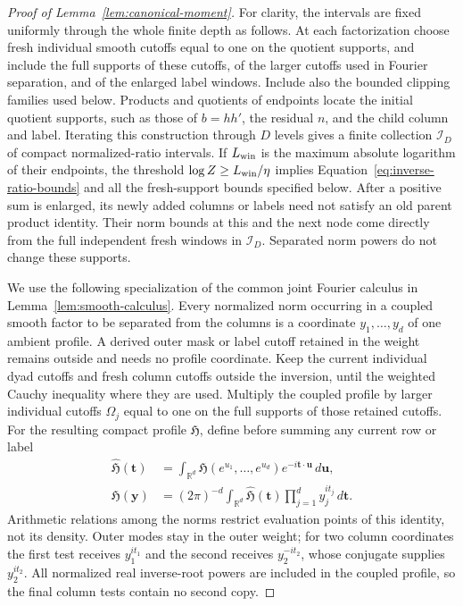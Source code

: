 \documentclass[11pt,a4paper]{article}
\numberwithin{equation}{section}
\numberwithin{figure}{section}
\theoremstyle{definition}
\theoremstyle{remark}
\begin{document}
\begin{proof}[Proof of Lemma~\ref{lem:canonical-moment}]
For clarity, the intervals are fixed uniformly through the whole finite
depth as follows.  At each factorization choose fresh individual smooth
cutoffs equal to one on the quotient supports, and include the full
supports of these cutoffs, of the larger cutoffs used in Fourier
separation, and of the enlarged label windows.  Include also the bounded
clipping families used below.  Products and quotients of endpoints locate
the initial quotient supports, such as those of \(b=hh'\), the residual
\(n\), and the child column and label.  Iterating this construction
through \(D\) levels gives a finite collection \(\mathcal I_D\) of compact
normalized-ratio intervals.  If \(L_{\rm win}\) is the maximum absolute
logarithm of their endpoints, the threshold
\(\log Z\ge L_{\rm win}/\eta\) implies
Equation~\eqref{eq:inverse-ratio-bounds} and all the fresh-support bounds
specified below.  After a positive sum is enlarged, its newly added
columns or labels need not satisfy an old parent product identity.  Their
norm bounds at this and the next node come directly from the full
independent fresh windows in \(\mathcal I_D\).  Separated norm powers do
not change these supports.

We use the following specialization of the common joint Fourier calculus in
Lemma~\ref{lem:smooth-calculus}.
Every normalized norm occurring in a coupled smooth factor to be separated
from the columns is a coordinate \(y_1,\ldots,y_d\) of one ambient profile.
A derived outer mask or label cutoff retained in the weight remains
outside and needs no profile coordinate.  Keep the current
individual dyad cutoffs and fresh column cutoffs outside the inversion,
until the weighted Cauchy inequality where they are used.  Multiply the
coupled profile by larger individual cutoffs \(\Omega_j\) equal to one
on the full supports of those retained cutoffs.  For the resulting
compact profile \(\mathfrak H\), define before summing any current row or
label
\begin{equation}\label{eq:inverse-log-fourier}
 \begin{split}
 \widehat{\mathfrak H}(\boldsymbol t)
   &=\int_{\mathbb R^d}\mathfrak H(e^{u_1},\ldots,e^{u_d})
             e^{-i\boldsymbol t\cdot\boldsymbol u}\,d\boldsymbol u,\\
 \mathfrak H(\boldsymbol y)
   &=(2\pi)^{-d}\int_{\mathbb R^d}\widehat{\mathfrak H}(\boldsymbol t)
          \prod_{j=1}^dy_j^{it_j}\,d\boldsymbol t.
 \end{split}
\end{equation}
Arithmetic relations among the norms restrict evaluation points of this
identity, not its density.  Outer modes stay in the outer weight; for
two column coordinates the first test receives \(y_1^{it_1}\) and the
second receives \(y_2^{-it_2}\), whose conjugate supplies
\(y_2^{it_2}\).  All normalized real inverse-root powers are included
in the coupled profile, so the final column tests contain no second copy.


\end{proof}
\end{document}

